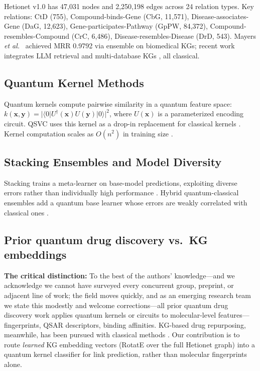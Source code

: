 Hetionet v1.0 \cite{himmelstein2017} has 47,031 nodes and 2,250,198 edges
across 24 relation types.
Key relations: CtD (755), Compound-binds-Gene (CbG, 11,571), Disease-associates-Gene
(DaG, 12,623), Gene-participates-Pathway (GpPW, 84,372), Compound-resembles-Compound
(CrC, 6,486), Disease-resembles-Disease (DrD, 543).
Mayers \emph{et al.}\ \cite{mayers2023} achieved MRR 0.9792 via ensemble on
biomedical KGs; recent work integrates LLM retrieval \cite{llmrag2025} and
multi-database KGs \cite{quantum2026}, all classical.

\subsection{Quantum Kernel Methods}

Quantum kernels compute pairwise similarity in a quantum feature space:
$k(\mathbf{x},\mathbf{y})=|\langle 0|U^\dagger(\mathbf{x})U(\mathbf{y})|0\rangle|^2$,
where $U(\mathbf{x})$ is a parameterized encoding circuit.
QSVC uses this kernel as a drop-in replacement for classical kernels
\cite{havlicek2019,schuld2019}.
Kernel computation scales as $O(n^2)$ in training size \cite{schuld2021}.

\subsection{Stacking Ensembles and Model Diversity}

Stacking trains a meta-learner on base-model predictions, exploiting diverse
errors rather than individually high performance \cite{wolpert1992}.
Hybrid quantum-classical ensembles add a quantum base learner whose errors are
weakly correlated with classical ones
\cite{havlicek2019,schuld2019,liu2021,abbas2021,incudini2023}.

\subsection{Prior quantum drug discovery vs.\ KG embeddings}
\label{sec:critical_distinction}

\textbf{The critical distinction:} To the best of the authors' knowledge---and
we acknowledge we cannot have surveyed every concurrent group, preprint, or
adjacent line of work; the field moves quickly, and as an emerging research
team we state this modestly and welcome corrections---all prior quantum drug
discovery work applies quantum kernels or circuits to molecular-level
features---fingerprints, QSAR descriptors, binding affinities.
KG-based drug repurposing, meanwhile, has been pursued with classical methods
\cite{mayers2023,llmrag2025,quantum2026}.
Our contribution is to route \emph{learned} KG embedding vectors (RotatE over the
full Hetionet graph) into a quantum kernel classifier for link prediction, rather
than molecular fingerprints alone.
\fi


